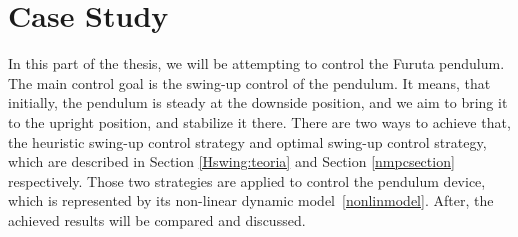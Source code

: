 \chapter{Case Study}
In this part of the thesis, we will be attempting to control the Furuta pendulum. The main control goal is the swing-up control of the pendulum. It means, that initially, the pendulum is steady at the downside position, and we aim to bring it to the upright position, and stabilize it there. There are two ways to achieve that, the heuristic swing-up control strategy and optimal swing-up control strategy, which are described in Section \ref{Hswing:teoria}  and Section \ref{nmpcsection} respectively. Those two strategies are applied to control the pendulum device, which is represented by its non-linear dynamic model~\ref{nonlinmodel}. After, the achieved results will be compared and discussed.
